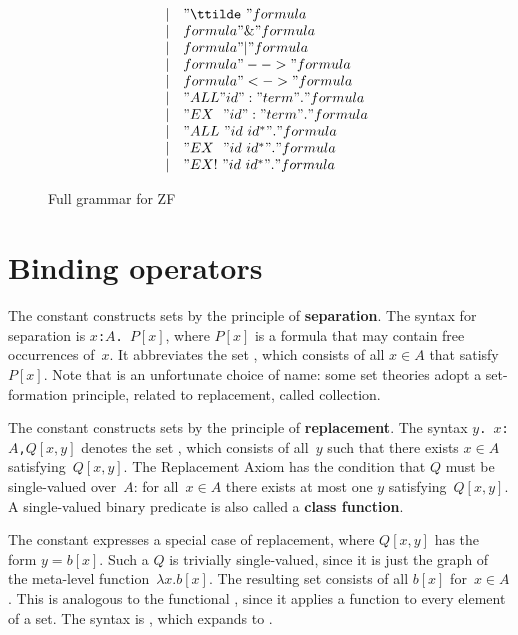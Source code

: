 \begin{figure}
\[\begin{array}{rcl}
         & | & "\ttilde\ " formula \\
         & | & formula " \& " formula \\
         & | & formula " | " formula \\
         & | & formula " --> " formula \\
         & | & formula " <-> " formula \\
         & | & "ALL " id ":" term " . " formula \\
         & | & "EX~~" id ":" term " . " formula \\
         & | & "ALL~" id~id^* " . " formula \\
         & | & "EX~~" id~id^* " . " formula \\
         & | & "EX!~" id~id^* " . " formula
  \end{array}
\]
\caption{Full grammar for ZF} \label{zf-syntax}
\end{figure} 


\section{Binding operators}
The constant  constructs sets by the principle of {\bf
  separation}.  The syntax for separation is
\hbox{\tt\ttlbrace$x$:$A$.\ $P[x]$\ttrbrace}, where $P[x]$ is a formula
that may contain free occurrences of~$x$.  It abbreviates the set , which consists of all $x\in A$ that
satisfy~$P[x]$.  Note that  is an unfortunate choice of
name: some set theories adopt a set-formation principle, related to
replacement, called collection.

The constant  constructs sets by the principle of {\bf
  replacement}.  The syntax
\hbox{\tt\ttlbrace$y$.\ $x$:$A$,$Q[x,y]$\ttrbrace} denotes the set 
, which consists of all~$y$ such
that there exists $x\in A$ satisfying~$Q[x,y]$.  The Replacement Axiom
has the condition that $Q$ must be single-valued over~$A$: for
all~$x\in A$ there exists at most one $y$ satisfying~$Q[x,y]$.  A
single-valued binary predicate is also called a {\bf class function}.

The constant  expresses a special case of replacement,
where $Q[x,y]$ has the form $y=b[x]$.  Such a $Q$ is trivially
single-valued, since it is just the graph of the meta-level
function~$\lambda x. b[x]$.  The resulting set consists of all $b[x]$
for~$x\in A$.  This is analogous to the \ML{} functional ,
since it applies a function to every element of a set.  The syntax is
, which expands to 
.

